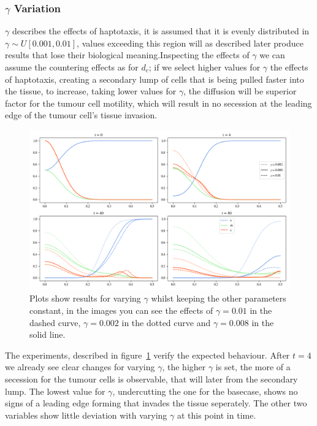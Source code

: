 \subsubsection*{$\gamma$ Variation}
$\gamma$ describes the effects of haptotaxis, it is assumed that it is evenly distributed in $\gamma \sim U[0.001,0.01]$, values exceeding this region will as described later produce results that lose their biological meaning.Inspecting the effects of $\gamma$ we can assume the countering effects as for $d_c$; if we select higher values for $\gamma$ the effects of haptotaxis, creating a secondary lump of cells that is being pulled faster into the tissue, to increase, taking lower values for $\gamma$, the diffusion will be superior factor for the tumour cell motility, which will result in no secession at the leading edge of the tumour cell's tissue invasion.
\begin{figure}[h]
    \centering
    \includegraphics[width=\textwidth]{resources/images/gamma_variation.png}
    \caption{Plots show results for varying $\gamma$ whilst keeping the other parameters constant, in the images you can see the effects of $\gamma=0.01$ in the dashed curve, $\gamma=0.002$ in the dotted curve and $\gamma=0.008$ in the solid line.}
    \label{fig:gamma_variation}
\end{figure}
The experiments, described in figure~\ref{fig:gamma_variation} verify the expected behaviour. After $t=4$ we already see clear changes for varying $\gamma$, the higher $\gamma$ is set, the more of a secession for the tumour cells is observable, that will later from the secondary lump. The lowest value for $\gamma$, undercutting the one for the basecase, shows no signs of a leading edge forming that invades the tissue seperately. The other two variables show little deviation with varying $\gamma$ at this point in time. \newline 
